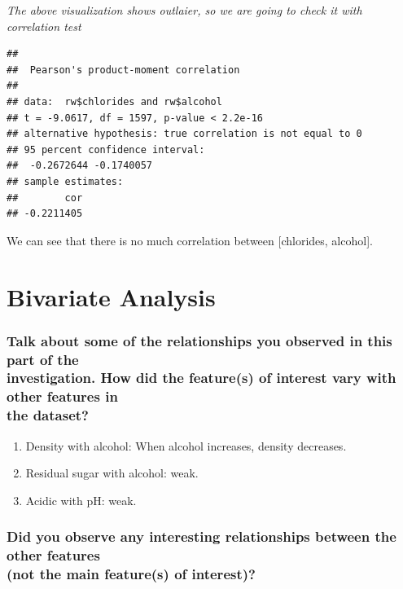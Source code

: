\documentclass[]{article}
\providecommand{\tightlist}{%
  \setlength{\itemsep}{0pt}\setlength{\parskip}{0pt}}
\begin{document}
\emph{The above visualization shows outlaier, so we are going to check
it with correlation test}

\begin{verbatim}
## 
##  Pearson's product-moment correlation
## 
## data:  rw$chlorides and rw$alcohol
## t = -9.0617, df = 1597, p-value < 2.2e-16
## alternative hypothesis: true correlation is not equal to 0
## 95 percent confidence interval:
##  -0.2672644 -0.1740057
## sample estimates:
##        cor 
## -0.2211405
\end{verbatim}

We can see that there is no much correlation between {[}chlorides,
alcohol{]}.

\section{Bivariate Analysis}\label{bivariate-analysis}

\subsubsection{\texorpdfstring{Talk about some of the relationships you
observed in this part of the\\
investigation. How did the feature(s) of interest vary with other
features in\\
the
dataset?}{Talk about some of the relationships you observed in this part of the investigation. How did the feature(s) of interest vary with other features in the dataset?}}\label{talk-about-some-of-the-relationships-you-observed-in-this-part-of-the-investigation.-how-did-the-features-of-interest-vary-with-other-features-in-the-dataset}

\begin{enumerate}
\def\labelenumi{\arabic{enumi}.}
\tightlist
\item
  Density with alcohol: When alcohol increases, density decreases.
\item
  Residual sugar with alcohol: weak.
\item
  Acidic with pH: weak.
\end{enumerate}

\subsubsection{\texorpdfstring{Did you observe any interesting
relationships between the other features\\
(not the main feature(s) of
interest)?}{Did you observe any interesting relationships between the other features (not the main feature(s) of interest)?}}\label{did-you-observe-any-interesting-relationships-between-the-other-features-not-the-main-features-of-interest}
\end{document}
